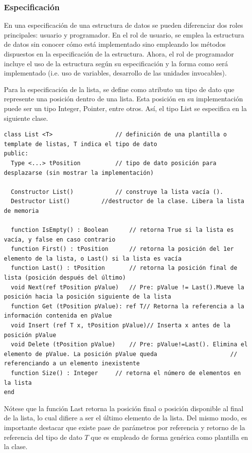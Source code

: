 \subsubsection{Especificación}

En una especificación de una estructura de datos se pueden diferenciar dos roles principales: usuario y programador. En el rol de usuario, se emplea la estructura de datos sin conocer cómo está implementado sino empleando los métodos dispuestos en la especificación de la estructura. Ahora, el rol de programador incluye el uso de la estructura según su especificación y la forma como será implementado (i.e. uso de variables, desarrollo de las unidades invocables).

Para la especificación de la lista, se define como atributo un tipo de dato que represente una posición dentro de una lista. Esta posición en su implementación puede ser un tipo Integer, Pointer, entre otros. Así, el tipo List se especifica en la siguiente clase.

\begin{lstlisting}[upquote=true, language=pseudo]
class List <T>					// definición de una plantilla o template de listas, T indica el tipo de dato
public:
  Type <...> tPosition			// tipo de dato posición para desplazarse (sin mostrar la implementación)

  Constructor List()			// construye la lista vacía ().
  Destructor List()			//destructor de la clase. Libera la lista de memoria

  function IsEmpty() : Boolean		// retorna True si la lista es vacía, y false en caso contrario
  function First() : tPosition		// retorna la posición del 1er elemento de la lista, o Last() si la lista es vacía
  function Last() : tPosition		// retorna la posición final de lista (posición después del último)
  void Next(ref tPosition pValue)	// Pre: pValue != Last().Mueve la posición hacia la posición siguiente de la lista
  function Get (tPosition pValue): ref T// Retorna la referencia a la información contenida en pValue
  void Insert (ref T x, tPosition pValue)// Inserta x antes de la posición pValue
  void Delete (tPosition pValue)	// Pre: pValue!=Last(). Elimina el elemento de pValue. La posición pValue queda						// referenciando a un elemento inexistente
  function Size() : Integer		// retorna el número de elementos en la lista
end
\end{lstlisting}

Nótese que la función Last retorna la posición final o posición disponible al final de la lista, lo cual difiere a ser el último elemento de la lista. Del mismo modo, es importante destacar que existe pase de parámetros por referencia y retorno de la referencia del tipo de dato $T$ que es empleado de forma genérica como plantilla en la clase.

